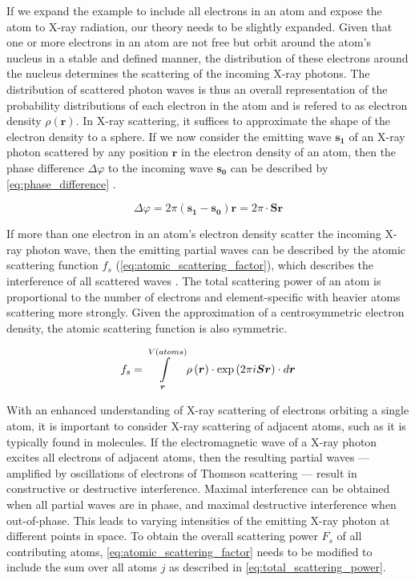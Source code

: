 If we expand the example to include all electrons in an atom and expose the atom to X-ray radiation, our theory needs to be slightly expanded. Given that one or more electrons in an atom are not free but orbit around the atom's nucleus in a stable and defined manner, the distribution of these electrons around the nucleus determines the scattering of the incoming X-ray photons. The distribution of scattered photon waves is thus an overall representation of the probability distributions of each electron in the atom and is refered to as electron density $\rho(\boldsymbol{r})$. In X-ray scattering, it suffices to approximate the shape of the electron density to a sphere. If we now consider the emitting wave $\boldsymbol{s_1}$ of an X-ray photon scattered by any position $\boldsymbol{r}$ in the electron density of an atom, then the phase difference $\Delta\varphi$ to the incoming wave $\boldsymbol{s_0}$ can be described by \cref{eq:phase_difference} \cite{Rupp2010-nc}.

\begin{equation}
    \Delta\varphi=2\pi\left(\boldsymbol{s_1}-\boldsymbol{s_0}\right)\boldsymbol{r}=2\pi \cdot \boldsymbol{S}\boldsymbol{r}
    \label{eq:phase_difference}
\end{equation}

If more than one electron in an atom's electron density scatter the incoming X-ray photon wave, then the emitting partial waves can be described by the atomic scattering function $f_s$ (\cref{eq:atomic_scattering_factor}), which describes the interference of all scattered waves \cite{Rupp2010-nc}. The total scattering power of an atom is proportional to the number of electrons and element-specific with heavier atoms scattering more strongly. Given the approximation of a centrosymmetric electron density, the atomic scattering function is also symmetric.

\begin{equation}
    f_s=\int\limits_{\boldsymbol{r}}^{V(atoms)}\rho\left(\boldsymbol{r}\right) \cdot \exp\left(2\pi\\i\boldsymbol{S}\boldsymbol{r}\right) \cdot d\boldsymbol{r}
    \label{eq:atomic_scattering_factor}
\end{equation}

With an enhanced understanding of X-ray scattering of electrons orbiting a single atom, it is important to consider X-ray scattering of adjacent atoms, such as it is typically found in molecules. If the electromagnetic wave of a X-ray photon excites all electrons of adjacent atoms, then the resulting partial waves --- amplified by oscillations of electrons of Thomson scattering --- result in constructive or destructive interference. Maximal interference can be obtained when all partial waves are in phase, and maximal destructive interference when out-of-phase. This leads to varying intensities of the emitting X-ray photon at different points in space. To obtain the overall scattering power $F_s$ of all contributing atoms, \cref{eq:atomic_scattering_factor} needs to be modified to include the sum over all atoms $j$ as described in \cref{eq:total_scattering_power}.

